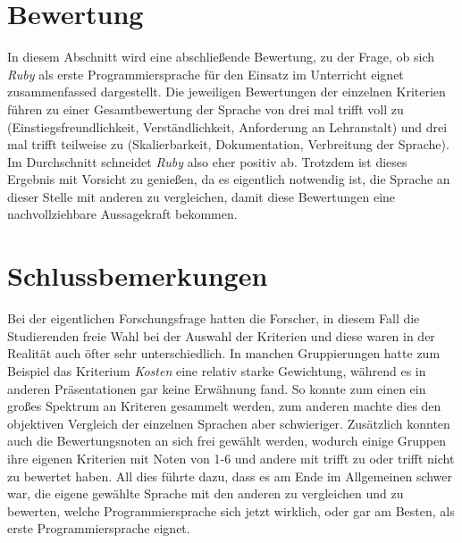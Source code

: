 \documentclass[12pt,DIV=14, version=first, BCOR=10mm,a4paper,twoside,parskip=half-,headsepline,headinclude]{scrartcl}
\begin{document}
\section{Bewertung}
\begin{flushleft}
In diesem Abschnitt wird eine abschließende Bewertung, zu der Frage, ob sich \textit{\glqq Ruby\grqq} als erste Programmiersprache für den Einsatz im Unterricht eignet zusammenfassed dargestellt. Die jeweiligen Bewertungen der einzelnen Kriterien führen zu einer Gesamtbewertung der Sprache von drei mal
{\glqq trifft voll zu\grqq} (Einstiegsfreundlichkeit, Verständlichkeit, Anforderung an Lehranstalt) und drei mal {\glqq trifft teilweise zu\grqq} (Skalierbarkeit, Dokumentation, Verbreitung der Sprache). Im Durchschnitt schneidet \textit{\glqq Ruby\grqq} also eher positiv ab.
Trotzdem ist dieses Ergebnis mit Vorsicht zu genießen, da es eigentlich notwendig ist, die Sprache an dieser Stelle mit anderen zu vergleichen, damit diese Bewertungen eine nachvollziehbare Aussagekraft bekommen.
\end{flushleft}

\section{Schlussbemerkungen}
\begin{flushleft}
Bei der eigentlichen Forschungsfrage hatten die Forscher, in diesem Fall die Studierenden freie Wahl bei der Auswahl der Kriterien und diese waren in der Realität auch öfter sehr unterschiedlich. In manchen Gruppierungen hatte zum Beispiel das Kriterium \textit{Kosten} eine relativ starke Gewichtung, während es in anderen Präsentationen gar keine Erwähnung fand. So konnte zum einen ein großes Spektrum an Kriteren gesammelt werden, zum anderen machte dies den objektiven Vergleich der einzelnen Sprachen aber schwieriger. Zusätzlich konnten auch die {\glqq Bewertungsnoten\grqq} an sich frei gewählt werden, wodurch einige Gruppen ihre eigenen Kriterien mit Noten von 1-6 und andere mit {\glqq trifft zu\grqq} oder {\glqq trifft nicht zu\grqq} bewertet haben. All dies führte dazu, dass es am Ende im Allgemeinen schwer war, die eigene gewählte Sprache mit den anderen zu vergleichen und zu bewerten, welche Programmiersprache sich jetzt wirklich, oder gar am {\glqq Besten\grqq}, als erste Programmiersprache eignet. 
\end{flushleft}

\pagebreak
\end{document}
